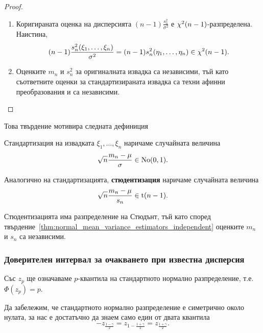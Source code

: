 \documentclass[numbers=endperiod, bibliography=totocnumbered]{scrartcl}
\begin{document}
\begin{proof}
\begin{enumerate}
    \item Коригираната оценка на дисперсията \( (n-1) \frac {s_n^2} {\sigma^2} \) е \( \chi^2(n-1) \)-разпределена. Наистина,
    \begin{equation*}
      (n-1) \frac {s_n^2(\xi_1, \ldots, \xi_n)} {\sigma^2}
      =
      (n-1) s_n^2(\eta_1, \ldots, \eta_n)
      \in
      \chi^2(n - 1).
    \end{equation*}

    \item Оценките \( m_n \) и \( s_n^2 \) за оригиналната извадка са независими, тъй като съответните оценки за стандартизираната извадка са техни афинни преобразования и са независими.
  \end{enumerate}
\end{proof}

Това твърдение мотивира следната дефиниция
\begin{definition}
  Стандартизация на извадката \( \xi_1, \ldots, \xi_n \) наричаме случайната величина
  \begin{equation*}
    \sqrt n \frac {m_n - \mu} \sigma \in \operatorname{No}(0, 1).
  \end{equation*}

  Аналогично на стандартизацията, \textbf{стюдентизация} наричаме случайната величина
  \begin{equation*}
    \sqrt n \frac {m_n - \mu} {s_n} \in \operatorname{t}(n - 1).
  \end{equation*}
\end{definition}

\begin{remark}
  Стюдентизацията има разпределение на Стюдънт, тъй като според твърдение~\ref{thm:normal_mean_variance_estimators_independent} оценките \( m_n \) и \( s_n \) са независими.
\end{remark}

\subsubsection{Доверителен интервал за очакването при известна дисперсия}

Със \( z_p \) ще означаваме \( p \)-квантила на стандартното нормално разпределение, т.е. \( \Phi(z_p) = p \).

Да забележим, че стандартното нормално разпределение е симетрично около нулата, за нас е достатъчно да знаем само един от двата квантила
\begin{equation*}
  -z_{\frac {1-\gamma} 2}
  =
  z_{1-\frac {1+\gamma} 2}
  =
  z_{\frac {1+\gamma} 2}.
\end{equation*}
\end{document}
